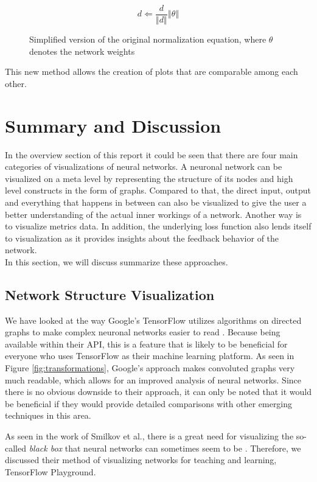 \documentclass{acmsiggraph}               %
\begin{document}
\begin{figure}
\begin{equation}
  d \Leftarrow \frac{d}{\left\Vert d \right\Vert} \left\Vert\theta\right\Vert
\end{equation}
\caption{Simplified version of the original normalization equation, where $\theta$ denotes the network weights \protect\cite{Li2017}}
\end{figure}

This new method allows the creation of plots that are comparable among each other.

\section{Summary and Discussion}
In the overview section of this report it could be seen that there are four main categories of visualizations of neural networks. A neuronal network can be visualized on a meta level by representing the structure of its nodes and high level constructs in the form of graphs. Compared to that, the direct input, output and everything that happens in between can also be visualized to give the user a better understanding of the actual inner workings of a network. Another way is to visualize metrics data. In addition, the underlying loss function also lends itself to visualization as it provides insights about the feedback behavior of the network.\\
In this section, we will discuss summarize these approaches.\\

\subsection{Network Structure Visualization}

We have looked at the way Google's TensorFlow utilizes algorithms on directed graphs to make complex neuronal networks easier to read \cite{Wongsuphasawat2018}. Because being available within their API, this is a feature that is likely to be beneficial for everyone who uses TensorFlow as their machine learning platform. As seen in Figure \ref{fig:transformations}, Google's approach makes convoluted graphs very much readable, which allows for an improved analysis of neural networks. Since there is no obvious downside to their approach, it can only be noted that it would be beneficial if they would provide detailed comparisons with other emerging techniques in this area.

As seen in the work of Smilkov et al., there is a great need for visualizing the so-called \textit{black box} that neural networks can sometimes seem to be \cite{Smilkov2017}. Therefore, we discussed their method of visualizing networks for teaching and learning, TensorFlow Playground.
\end{document}
